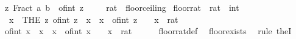 \begin{isabellebody}
\ {\isachardoublequoteopen}{\isasymexists}z{\isachardot}{\kern0pt}\ Fract\ a\ b\ {\isasymle}\ of{\isacharunderscore}{\kern0pt}int\ z{\isachardoublequoteclose}\ \isacommand{{\isachardot}{\kern0pt}{\isachardot}{\kern0pt}}\isamarkupfalse%
\isanewline
\ \ \isamarkupfalse%
\isanewline
{}\isamarkupfalse%
%
\endisatagproof
{\isafoldproof}%
%
\isadelimproof
\isanewline
%
\endisadelimproof
\isanewline
{}\isamarkupfalse%
\ rat\ {\isacharcolon}{\kern0pt}{\isacharcolon}{\kern0pt}\ floor{\isacharunderscore}{\kern0pt}ceiling\isanewline
{}\isanewline
\isanewline
{}\isamarkupfalse%
\ floor{\isacharunderscore}{\kern0pt}rat\ {\isacharcolon}{\kern0pt}{\isacharcolon}{\kern0pt}\ {\isachardoublequoteopen}rat\ {\isasymRightarrow}\ int{\isachardoublequoteclose}\isanewline
\ \ x{\isasymrfloor}\ {\isacharequal}{\kern0pt}\ {\isacharparenleft}{\kern0pt}THE\ z{\isachardot}{\kern0pt}\ of{\isacharunderscore}{\kern0pt}int\ z\ {\isasymle}\ x\ {\isasymand}\ x\ {\isacharless}{\kern0pt}\ of{\isacharunderscore}{\kern0pt}int\ {\isacharparenleft}{\kern0pt}z\ {\isacharplus}{\kern0pt}\ {}{\isacharparenright}{\kern0pt}{\isacharparenright}{\kern0pt}{\isachardoublequoteclose}\ \ x\ {\isacharcolon}{\kern0pt}{\isacharcolon}{\kern0pt}\ rat\isanewline
\isanewline
{}\isamarkupfalse%
\isanewline
%
\isadelimproof
%
\endisadelimproof
%
\isatagproof
{}\isamarkupfalse%
\isanewline
\ \ \isamarkupfalse%
\ {\isachardoublequoteopen}of{\isacharunderscore}{\kern0pt}int\ {\isasymlfloor}x{\isasymrfloor}\ {\isasymle}\ x\ {\isasymand}\ x\ {\isacharless}{\kern0pt}\ of{\isacharunderscore}{\kern0pt}int\ {\isacharparenleft}{\kern0pt}{\isasymlfloor}x{\isasymrfloor}\ {\isacharplus}{\kern0pt}\ {}{\isacharparenright}{\kern0pt}{\isachardoublequoteclose}\ \ x\ {\isacharcolon}{\kern0pt}{\isacharcolon}{\kern0pt}\ rat\isanewline
\ \ \ \ \isamarkupfalse%
\ floor{\isacharunderscore}{\kern0pt}rat{\isacharunderscore}{\kern0pt}def\ \isamarkupfalse%
\ floor{\isacharunderscore}{\kern0pt}exists{}\ \isamarkupfalse%
\ {\isacharparenleft}{\kern0pt}rule\ theI{\isacharprime}{\kern0pt}{\isacharparenright}{\kern0pt}\isanewline
{}\isamarkupfalse%
%
\endisatagproof
{\isafoldproof}%
%
\isadelimproof
\isanewline
%
\endisadelimproof
\isanewline
{}\isamarkupfalse%
\isanewline
\isanewline
{}\isamarkupfalse%

\end{isabellebody}
